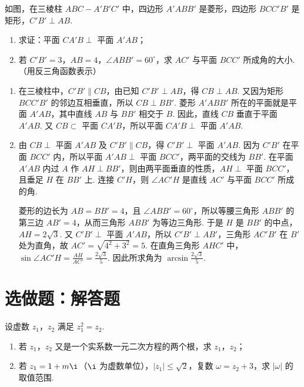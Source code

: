 \documentclass[UTF8,a4paper,oneside,11pt]{ctexbook}
\begin{document}
\begin{problem}
如图，在三棱柱 \(ABC-A'B'C'\) 中，四边形 \(A'ABB'\) 是菱形，四边形 \(BCC'B'\) 是矩形，\(C'B' \perp AB\).

\begin{enumerate}
\item 求证：平面 \(CA'B \perp\) 平面 \(A'AB\)；
\item 若 \(C'B' = 3\)，\(AB = 4\)，\(\angle ABB' = 60^{\circ}\)，求 \(AC'\) 与平面 \(BCC'\) 所成角的大小.（用反三角函数表示）
\end{enumerate}

\end{problem}

\begin{solution}
\begin{enumerate}
\item 在三棱柱中，\(C'B'\parallel CB\)，由已知 \(C'B'\perp AB\)，得 \(CB\perp AB\). 又因为矩形 \(BCC'B'\) 的邻边互相垂直，所以 \(CB\perp BB'\). 菱形 \(A'ABB'\) 所在的平面就是平面 \(A'AB\)，其中直线 \(AB\) 与 \(BB'\) 相交于 \(B\). 因此，直线 \(CB\) 垂直于平面 \(A'AB\). 又 \(CB\subset\) 平面 \(CA'B\)，所以平面 \(CA'B\perp\) 平面 \(A'AB\).
\item 由 \(CB\perp\) 平面 \(A'AB\) 及 \(C'B'\parallel CB\)，得 \(C'B'\perp\) 平面 \(A'AB\). 因为 \(C'B'\) 在平面 \(BCC'\) 内，所以平面 \(A'AB\perp\) 平面 \(BCC'\)，两平面的交线为 \(BB'\). 在平面 \(A'AB\) 内过 \(A\) 作 \(AH\perp BB'\)，则由两平面垂直的性质，\(AH\perp\) 平面 \(BCC'\)，且垂足 \(H\) 在 \(BB'\) 上. 连接 \(C'H\)，则 \(\angle AC'H\) 是直线 \(AC'\) 与平面 \(BCC'\) 所成的角.

菱形的边长为 \(AB=BB'=4\)，且 \(\angle ABB'=60^{\circ}\)，所以等腰三角形 \(ABB'\) 的第三边 \(AB'=4\)，从而三角形 \(ABB'\) 为等边三角形. 于是 \(H\) 是 \(BB'\) 的中点，\(AH=2\sqrt3\). 又 \(C'B'\perp\) 平面 \(A'AB\)，所以 \(C'B'\perp AB'\)，三角形 \(AC'B'\) 在 \(B'\) 处为直角，故 \(AC'=\sqrt{4^2+3^2}=5\). 在直角三角形 \(AHC'\) 中，\(\sin\angle AC'H=\frac{AH}{AC'}=\frac{2\sqrt3}{5}\). 因此所求角为 \(\arcsin\frac{2\sqrt3}{5}\).
\end{enumerate}
\end{solution}

\section{选做题：解答题}

\begin{problem}[A]
设虚数 \(z_{1}\)，\(z_{2}\) 满足 \(z_{1}^{2}=z_{2}\).

\begin{enumerate}
\item 若 \(z_{1}\)，\(z_{2}\) 又是一个实系数一元二次方程的两个根，求 \(z_{1}\)，\(z_{2}\)；
\item 若 \(z_{1}=1+m\i\)（\(\i\) 为虚数单位），\(|z_{1}|\leqslant\sqrt{2}\)，复数 \(\omega=z_{2}+3\)，求 \(|\omega|\) 的取值范围.
\end{enumerate}
\end{problem}
\end{document}
